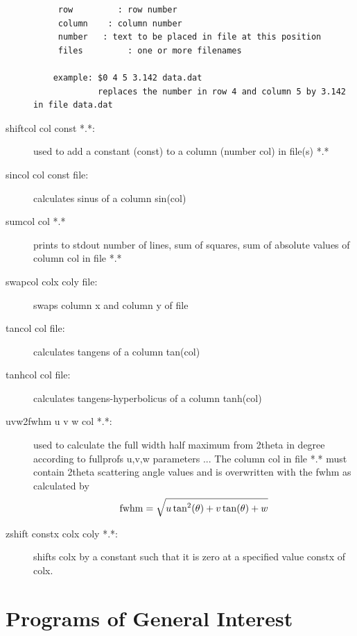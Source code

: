 \begin{description}
\begin{verbatim}
     row         : row number
     column    : column number
     number   : text to be placed in file at this position
     files         : one or more filenames

    example: $0 4 5 3.142 data.dat
             replaces the number in row 4 and column 5 by 3.142 in file data.dat
\end{verbatim}
\item [\prg shiftcol\index{shiftcol} col const *.*:] used to add a constant (const) to a column %
(number col) in file(s) *.*
\item [\prg sincol\index{sincol} col const file:] calculates sinus of a column sin(col) 
\item [\prg sumcol\index{sumcol} col *.*] prints to stdout number of lines, sum of squares, sum %
of absolute values of column col in file *.*
\item [\prg swapcol\index{swapcol} colx coly file:] swaps column x and column y of file
\item [\prg tancol\index{tancol} col file:] calculates tangens of a column tan(col)
\item [\prg tanhcol\index{tanhcol} col file:] calculates tangens-hyperbolicus of a column tanh(col)
\item [\prg uvw2fwhm\index{uvw2fwhm} u v w col *.*:] used to calculate the full
                   width half maximum from
                   2theta in degree according to fullprofs u,v,w parameters ...
                  The column col in file *.* must contain 2theta scattering angle
                 values and is overwritten with the fwhm as calculated by
                  \begin{equation}
                     {\rm  fwhm }= \sqrt {u \tan^2(\theta) + v \tan(\theta) + w}
                \end{equation}
\item [\prg zshift\index{zshift} constx colx coly *.*:] shifts colx by a constant such that it %
is zero at a specified value constx of colx. 
\end{description}

\section{Programs of General Interest}

